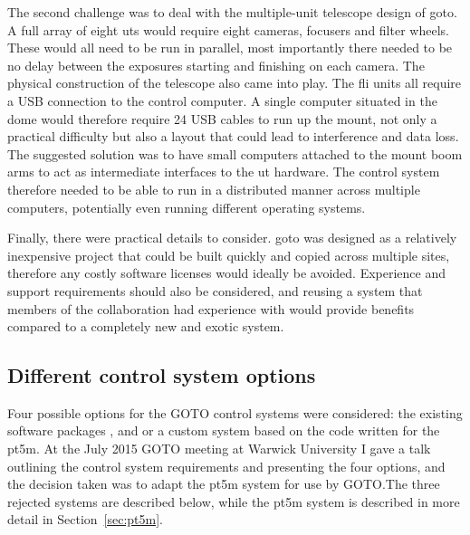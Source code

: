 \begin{colsection}
\begin{colsection}
The second challenge was to deal with the multiple-unit telescope design of \gls{goto}. A full array of eight \glspl{ut} would require eight cameras, focusers and filter wheels. These would all need to be run in parallel, most importantly there needed to be no delay between the exposures starting and finishing on each camera. The physical construction of the telescope also came into play. The \gls{fli} units all require a USB connection to the control computer. A single computer situated in the dome would therefore require 24 USB cables to run up the mount, not only a practical difficulty but also a layout that could lead to interference and data loss. The suggested solution was to have small computers attached to the mount boom arms to act as intermediate interfaces to the \gls{ut} hardware. The control system therefore needed to be able to run in a distributed manner across multiple computers, potentially even running different operating systems.

Finally, there were practical details to consider. \gls{goto} was designed as a relatively inexpensive project that could be built quickly and copied across multiple sites, therefore any costly software licenses would ideally be avoided. Experience and support requirements should also be considered, and reusing a system that members of the collaboration had experience with would provide benefits compared to a completely new and exotic system.

\end{colsection}


\subsection{Different control system options}
\label{sec:control_options}
\begin{colsection}

Four possible options for the GOTO control systems were considered: the existing software packages ,  and  or a custom system based on the code written for the \gls{pt5m}. At the July 2015 GOTO meeting at Warwick University I gave a talk outlining the control system requirements and presenting the four options, and the decision taken was to adapt the \gls{pt5m} system for use by GOTO.\@ The three rejected systems are described below, while the \gls{pt5m} system is described in more detail in Section~\ref{sec:pt5m}.


\end{colsection}
\end{colsection}
